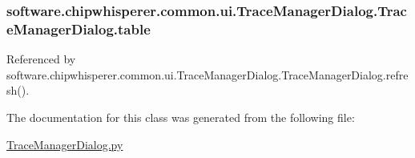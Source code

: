 \hypertarget{classsoftware_1_1chipwhisperer_1_1common_1_1ui_1_1TraceManagerDialog_1_1TraceManagerDialog_afcdeac0abef4cfc5f074d2e497c66b27}{}
\subsubsection[{table}]{\setlength{\rightskip}{0pt plus 5cm}software.\+chipwhisperer.\+common.\+ui.\+Trace\+Manager\+Dialog.\+Trace\+Manager\+Dialog.\+table}\label{classsoftware_1_1chipwhisperer_1_1common_1_1ui_1_1TraceManagerDialog_1_1TraceManagerDialog_afcdeac0abef4cfc5f074d2e497c66b27}


Referenced by software.\+chipwhisperer.\+common.\+ui.\+Trace\+Manager\+Dialog.\+Trace\+Manager\+Dialog.\+refresh().



The documentation for this class was generated from the following file\+:\begin{DoxyCompactItemize}
\item 
\hyperlink{TraceManagerDialog_8py}{Trace\+Manager\+Dialog.\+py}\end{DoxyCompactItemize}
